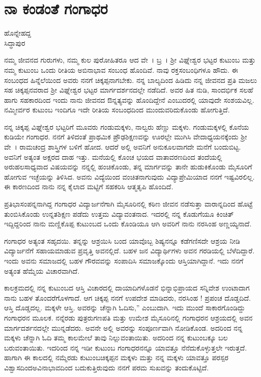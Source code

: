 {\fontsize{14}{16}\selectfont
\chapter{ನಾ ಕಂಡಂತೆ ಗಂಗಾಧರ}

\begin{center}
\smallskip

ಹೊನ್ನೇಹದ್ದ\\ 
ಸಿದ್ಧಾಪುರ
\addrule
\end{center}

ನಮ್ಮ ಜೀವನದ ಗುರುಗಳು, ನಮ್ಮ ಕುಲ ಪುರೋಹಿತರೂ ಆದ ವೇ~। ಬ್ರ~। ಶ್ರೀ ವಿಘ್ನೇಶ್ವರ ಭಟ್ಟರ ಕುಟುಂಬ ಮತ್ತು ನಮ್ಮ ಕುಟುಂಬ ಒಂದು ರೀತಿಯ ಅಬಿನಾಭಾವ ಸಂಬಂಧ ಹೊಂದಿವೆ. ನಾವು ರಕ್ತಸಂಬಂಧಿಗಳೂ ಹೌದು. ಈ ಸಂಬಂಧದ ಹಿನ್ನೆಲೆಯಿಂದ ಅವರು ನನಗೆ ಚಿಕ್ಕಪ್ಪನಾಗಬೇಕು. ನನ್ನ ಬಾಲ್ಯದಿಂದ ಹಿಡಿದು ನನ್ನ ಜೀವನದ ಪ್ರತಿ ಮಜಲು ಸಹ ಚಿಕ್ಕಪ್ಪನವರಾದ ಶ್ರೀ ವಿಘ್ನೇಶ್ವರ ಭಟ್ಟರ ಮಾರ್ಗದರ್ಶನದಲ್ಲೇ ನಡೆದಿದೆ. ಅವರ ಹಿತ ನುಡಿ, ಸಾಂದರ್ಭಿಕ ಸಲಹೆ ಹಾಗು ಸಹಕಾರದಿಂದ ಇಂದು ನಾನು ಜೀವನದ ಔನ್ನತ್ಯವನ್ನು ಹೊಂದಿದ್ದೇನೆ ಎಂಬುದರಲ್ಲಿ ಯಾವುದೇ ಸಂಶಯವಿಲ್ಲ. ನಮ್ಮೀರ್ವರ ಕುಟುಂಬ ಇಂದಿಗೂ ಇದೇ ರೀತಿಯ ಸಂಬಂಧದಿಂದ ಮುಂದುವರಿದುಕೊಂಡು ಹೋಗುತ್ತಿದೆ.

ನನ್ನ ಚಿಕ್ಕಪ್ಪ ವಿಘ್ನೇಶ್ವರ ಭಟ್ಟರಿಗೆ ಮೂವರು ಗಂಡುಮಕ್ಕಳು, ನಾಲ್ವರು ಹೆಣ್ಣು ಮಕ್ಕಳು. ಗಂಡುಮಕ್ಕಳಲ್ಲಿ ಕೊನೆಯ ಕುಡಿಯೇ ಗಂಗಾಧರ. ನನಗೆ ತಿಳಿದಂತೆ ಪ್ರಾಥಮಿಕ ಪ್ರೌಢಶಿಕ್ಷಣವನ್ನು ಊರಲ್ಲೇ ಮುಗಿಸಿ ವೇದಾಧ್ಯಯನಕ್ಕೆಂದು ಶ್ರೀ ವೇ~। ರಾಮಚಂದ್ರ ಶಾಸ್ತ್ರಿಗಳ ಬಳಿಗೆ ಹೋದ. ಆದರೆ ಅಲ್ಲಿ ಅವನಿಗೆ ಅನುಕೂಲವಾಗದೇ ಮನೆಗೆ ಬಂದುಬಿಟ್ಟ. ಅವನಿಗೆ ಅತ್ಯಂತ ಅಕ್ಷರದ ದಾಹ ಇತ್ತು. ಮನೆಯಲ್ಲಿ ಕೊಂಚ ಭಯದ ವಾತಾ\-ವರಣದಿಂದ ತಂದೆಯಲ್ಲಿ ಅರುಹಲಸಾಧ್ಯವಾದ ವಿಷಯವನ್ನು ನನ್ನಲ್ಲಿ ಹಂಚಿಕೊಂಡು, ತನ್ನ ಮಾರ್ಗವನ್ನು ತಾನೇ ಹುಡುಕಿಕೊಂಡು ಮೈಸೂರಿಗೆ ಹೋಗುವ ಇಚ್ಛೆಯನ್ನು ತಿಳಿಸಿದ. ಅವನು ವಿದ್ಯೆಯಿಂದ ವಂಚಿತನಾಗುವುದು ವಿದ್ಯಾಪ್ರೇಮಿಯಾದ ನನಗೆ ಇಷ್ಟವಿರಲಿಲ್ಲ.  ಈ ಕಾರಣದಿಂದ ನಾನು ನನ್ನ ಕೈಲಾದ ಮಟ್ಟಿಗೆ ಸಹಕರಿಸಿ  ಆತ್ಮತೃಪಿ ಹೊಂದಿದೆ.

ಪ್ರತಿಭಾಸಂಪನ್ನನಾಗಿದ್ದ ಗಂಗಾಧರ ವಿದ್ಯಾರ್ಜನೆಗಾಗಿ ಮೈಸೂರಿನಲ್ಲಿ ಕಠಿಣ ಜೀವನ ನಡೆಸುತ್ತಾ ವಾರಾನ್ನದಿಂದ ಹೊಟ್ಟೆ ತುಂಬಿಸಿಕೊಂಡು  ಉನ್ನತಶಿಕ್ಷಣ ಪಡೆದು ಉತ್ತಮ ವಿದ್ಯಾವಂತನಾದ. ಇದರಲ್ಲಿ ನನ್ನ ಕೊಡುಗೆಯೂ ಕಿಂಚಿತ್ ಇದ್ದಿದ್ದರಿಂದ ನಾನು ಮಣ್ಣಿಕೊಪ್ಪ ಕುಟುಂಬದ ಒಂದು ಕೊಂಡಿಯೂ ಆಗಿ ಅವರಿಗೆ ನಾನು ನರಸಿಂಹ ಅಣ್ಣಯ್ಯನಾದೆ. 

ಗಂಗಾಧರ ಅತ್ಯಂತ ಸಹೃದಯಿ. ತನ್ನನ್ನು ಆಶ್ರಯಿಸಿ ಬಂದ ಯಾವೊಬ್ಬ ಶಿಷ್ಯನನ್ನೂ ಕಡೆಗಣಿಸದೇ ಆಶ್ರಯ ನೀಡಿ ವಿದ್ಯಾರ್ಜನೆಗೆ ಸಹಾಯಮಾಡುವ ಪ್ರವೃತ್ತಿ ಅವನಲ್ಲಿದೆ. ಬಹಳ ಜನ ವಿದ್ಯಾರ್ಥಿಗಳು ಅವನ ಗರಡಿಯಲ್ಲಿ ಬೆಳೆದಿದ್ದಾರೆ. ಇಂದು ಅವನು ಸಮಾಜದಲ್ಲಿ ಬಹಳ ಗೌರವವನ್ನು ಸಂಪಾದಿಸಿ ಸಮಾಜಕ್ಕೊಂದು ಆಸ್ತಿಯಾಗಿದ್ದಾನೆ. ಇದು ನನಗೆ ಅತ್ಯಂತ ಹೆಮ್ಮೆಯ ವಿಚಾರವಾಗಿದೆ.

ಕಾಲಕ್ರಮದಲ್ಲಿ ನನ್ನ ಕುಟುಂಬದ ಆಸ್ತಿ ವಿಚಾರದಲ್ಲಿ ದಾಯಾದಿಗಳೊಡನೆ ಭಿನ್ನಾಭಿಪ್ರಾಯದ ಸನ್ನಿವೇಶ ಉಂಟಾದಾಗ ನಾನು ಬಹಳ ತೊಂದರೆಗೊಳಗಾದೆ. ಆಗ ಚಿಕ್ಕಪ್ಪ ನನಗೆ ಉಪದೇಶ ಮಾಡಿದರು, ನರಸಿಂಹ ! ಪ್ರಪಂಚ ದೊಡ್ಡದಿದೆ. ಆಸ್ತಿ ದೊಡ್ಡದಲ್ಲ. ಮಕ್ಕಳೇ ಆಸ್ತಿ. ಅವರನ್ನು ಚೆನ್ನಾಗಿ ಓದಿಸು,” ಎಂಬುದಾಗಿ. ಇದು ಮುಂದೆ ಸಾಕಾರ\-ಗೊಂಡಿದ್ದು ಗಂಗಾಧರನ ಮೂಲಕ. ನನ್ನೆರಡು ಪುತ್ರರು\enginline{-}ಗಣಪತಿ ಮತ್ತು ಉಮೇಶ ಮೈಸೂರಿನಲ್ಲಿ ಗಂಗಾಧರನ ಆಶ್ರಯದಲ್ಲಿ ಅವನ ಮಾರ್ಗದರ್ಶನದಲ್ಲೇ ಮುನ್ನಡೆದರು. ಅವನೇ ಅಲ್ಲಿ ಅವರನ್ನು ಸಂಪೂರ್ಣವಾಗಿ ನೋಡಿಕೊಂಡ. ಅದರಿಂದ ನನ್ನ ಮಕ್ಕಳು ಚೆನ್ನಾಗಿ ಓದಿ ತಮ್ಮ ಕಾಲಮೇಲೆ ತಾವು ನಿಲ್ಲುವಂತಾಯಿತು.  ಅದರಿಂದ ನನ್ನ ಕುಟುಂಬಕ್ಕೂ  ಬಲ ಬರುವಂತಾಯಿತು. ಇದರಿಂದ ನನ್ನ ಇಡೀ ಕುಟುಂಬ ಗಂಗಾಧರನನ್ನೂ ಯಾವತ್ತೂ ನೆನೆದುಕೊಳ್ಳುತ್ತಲೇ ಇರುತ್ತದೆ. ಹಾಗಾಗಿ ಈ ಕಾಲದಲ್ಲಿ ನಮ್ಮೆರಡು ಕುಟುಂಬ\enginline{-}ಚಿಕ್ಕಪ್ಪನ ಮಕ್ಕಳು ಮತ್ತು ನನ್ನ ಮಕ್ಕಳು ಯಾವತ್ತೂ ಪರಸ್ಪರ ವಿಶ್ವಾಸದಿಂದ\enginline{-}ಅವಿನಾಭಾವದಿಂದ ಬದುಕುತ್ತಿರುವುದು ನನಗೆ ಪರಮ ಸುಖವನ್ನು ತಂದುಕೊಟ್ಟಿದೆ. 

}
